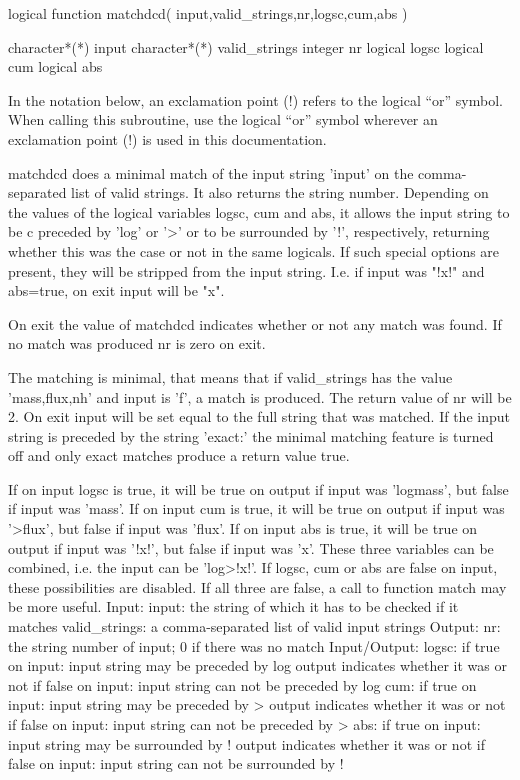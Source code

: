 \par{\tenpoint
{\eightpoint\begintt
      logical function matchdcd( input,valid_strings,nr,logsc,cum,abs )

      character*(*) input
      character*(*) valid_strings
      integer       nr
      logical       logsc
      logical       cum
      logical       abs
    
 In the notation below, an exclamation point (!) refers to the logical ``or''
 symbol.  When calling this subroutine, use the logical ``or'' symbol wherever
 an exclamation point (!) is used in this documentation.
\endtt}
{\eightpoint\begintt
 matchdcd does a minimal match of the input string 'input' on the
 comma-separated list of valid strings. It also returns the string number.
 Depending on the values of the logical variables logsc, cum and abs, it allows
 the input string to be c preceded by 'log' or '>' or to be surrounded by '!',
 respectively, returning whether this was the case or not in the same logicals.
 If such special options are present, they will be stripped from the input
 string. I.e. if input was "!x!" and abs=true, on exit input will be "x".
\endtt}
{\eightpoint\begintt
 On exit the value of matchdcd indicates whether or not any match was found. If
 no match was produced nr is zero on exit.

 The matching is minimal, that means that if valid_strings has the value
 'mass,flux,nh' and input is 'f', a match is produced. The return value of nr
 will be 2. On exit input will be set equal to the full string that was
 matched.
 If the input string is preceded by the string 'exact:' the minimal matching
 feature is turned off and only exact matches produce a return value true.
\endtt}
{\eightpoint\begintt
 If on input logsc is true, it will be true on output if input was 'logmass',
 but false if input was 'mass'.
 If on input cum is true, it will be true on output if input was '>flux', but
 false if input was 'flux'.
 If on input abs is true, it will be true on output if input was '!x!', but
 false if input was 'x'.
 These three variables can be combined, i.e. the input can be 'log>!x!'. If
 logsc, cum or abs are false on input, these possibilities are disabled. If all
 three are false, a call to function match may be more useful.
\endtt}
{\eightpoint\begintt
 Input:
   input:         the string of which it has to be checked if it matches
   valid_strings: a comma-separated list of valid input strings
 Output:
   nr:            the string number of input; 0 if there was no match
 Input/Output:
   logsc:         if true on input: input string may be preceded by log
                  output indicates whether it was or not
                  if false on input: input string can not be preceded by log
   cum:           if true on input: input string may be preceded by >
                  output indicates whether it was or not
                  if false on input: input string can not be preceded by >
   abs:           if true on input: input string may be surrounded by !
                  output indicates whether it was or not
                  if false on input: input string can not be surrounded by !
\endtt}
\par}
